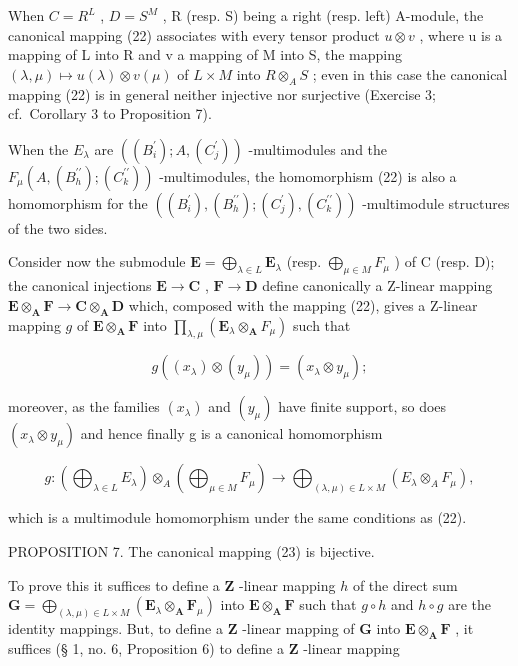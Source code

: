 When \(C = R^{L}\) , \(D = S^{M}\) , R (resp. S) being a right (resp. left) A-module, the canonical mapping (22) associates with every tensor product \(u \otimes v\) , where u is a mapping of L into R and v a mapping of M into S, the mapping \((\lambda, \mu) \mapsto u(\lambda) \otimes v(\mu)\) of \(L \times M\) into \(R \otimes_{A} S\) ; even in this case the canonical mapping (22) is in general neither injective nor surjective (Exercise 3; cf.~Corollary 3 to Proposition 7).

When the \(E_{\lambda}\) are \(((B_{i}^{\prime}); A, (C_{j}^{\prime}))\) -multimodules and the \(F_{\mu}(A, (B_{h}^{\prime\prime}); (C_{k}^{\prime\prime}))\) -multimodules, the homomorphism (22) is also a homomorphism for the \(((B_{i}^{\prime}), (B_{h}^{\prime\prime}); (C_{j}^{\prime}), (C_{k}^{\prime\prime}))\) -multimodule structures of the two sides.

Consider now the submodule \(\mathbf{E} = \bigoplus_{\lambda \in L} \mathbf{E}_{\lambda}\) (resp. \(\bigoplus_{\mu \in M} F_{\mu}\) ) of C (resp. D); the canonical injections \(\mathbf{E} \to \mathbf{C}\) , \(\mathbf{F} \to \mathbf{D}\) define canonically a Z-linear mapping \(\mathbf{E} \otimes_{\mathbf{A}} \mathbf{F} \to \mathbf{C} \otimes_{\mathbf{A}} \mathbf{D}\) which, composed with the mapping (22), gives a Z-linear mapping \(g\) of \(\mathbf{E} \otimes_{\mathbf{A}} \mathbf{F}\) into \(\prod_{\lambda, \mu} (\mathbf{E}_{\lambda} \otimes_{\mathbf{A}} F_{\mu})\) such that

\[
g ((x _ {\lambda}) \otimes (y _ {\mu})) = (x _ {\lambda} \otimes y _ {\mu});
\]

moreover, as the families \((x_{\lambda})\) and \((y_{\mu})\) have finite support, so does \((x_{\lambda} \otimes y_{\mu})\) and hence finally g is a canonical homomorphism

\[
g: \left(\bigoplus_ {\lambda \in L} E _ {\lambda}\right) \otimes_ {A} \left(\bigoplus_ {\mu \in M} F _ {\mu}\right)\rightarrow \bigoplus_ {(\lambda , \mu) \in L \times M} (E _ {\lambda} \otimes_ {A} F _ {\mu}),\tag{23}
\]

which is a multimodule homomorphism under the same conditions as (22).

PROPOSITION 7. The canonical mapping (23) is bijective.

To prove this it suffices to define a \(\mathbf{Z}\) -linear mapping \(h\) of the direct sum \(\mathbf{G} = \bigoplus_{(\lambda, \mu) \in L \times M} (\mathbf{E}_{\lambda} \otimes_{\mathbf{A}} \mathbf{F}_{\mu})\) into \(\mathbf{E} \otimes_{\mathbf{A}} \mathbf{F}\) such that \(g \circ h\) and \(h \circ g\) are the identity mappings. But, to define a \(\mathbf{Z}\) -linear mapping of \(\mathbf{G}\) into \(\mathbf{E} \otimes_{\mathbf{A}} \mathbf{F}\) , it suffices (§ 1, no. 6, Proposition 6) to define a \(\mathbf{Z}\) -linear mapping

